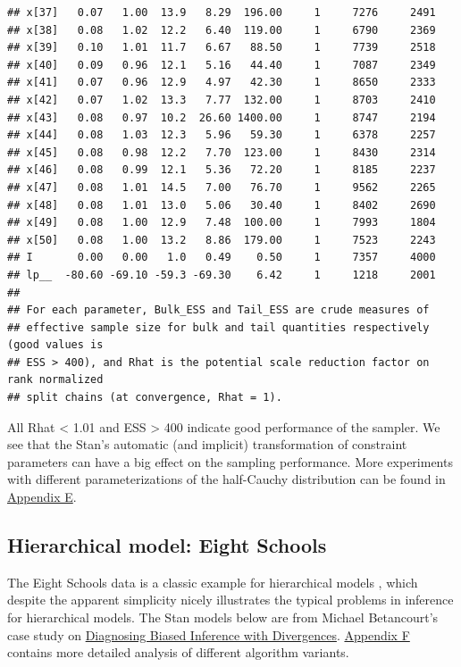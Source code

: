 \documentclass[american,]{article}
\begin{document}
\begin{verbatim}
## x[37]   0.07   1.00  13.9   8.29  196.00     1     7276     2491
## x[38]   0.08   1.02  12.2   6.40  119.00     1     6790     2369
## x[39]   0.10   1.01  11.7   6.67   88.50     1     7739     2518
## x[40]   0.09   0.96  12.1   5.16   44.40     1     7087     2349
## x[41]   0.07   0.96  12.9   4.97   42.30     1     8650     2333
## x[42]   0.07   1.02  13.3   7.77  132.00     1     8703     2410
## x[43]   0.08   0.97  10.2  26.60 1400.00     1     8747     2194
## x[44]   0.08   1.03  12.3   5.96   59.30     1     6378     2257
## x[45]   0.08   0.98  12.2   7.70  123.00     1     8430     2314
## x[46]   0.08   0.99  12.1   5.36   72.20     1     8185     2237
## x[47]   0.08   1.01  14.5   7.00   76.70     1     9562     2265
## x[48]   0.08   1.01  13.0   5.06   30.40     1     8402     2690
## x[49]   0.08   1.00  12.9   7.48  100.00     1     7993     1804
## x[50]   0.08   1.00  13.2   8.86  179.00     1     7523     2243
## I       0.00   0.00   1.0   0.49    0.50     1     7357     4000
## lp__  -80.60 -69.10 -59.3 -69.30    6.42     1     1218     2001
## 
## For each parameter, Bulk_ESS and Tail_ESS are crude measures of 
## effective sample size for bulk and tail quantities respectively (good values is 
## ESS > 400), and Rhat is the potential scale reduction factor on rank normalized
## split chains (at convergence, Rhat = 1).
\end{verbatim}

All Rhat \textless{} 1.01 and ESS \textgreater{} 400 indicate good
performance of the sampler. We see that the Stan's automatic (and
implicit) transformation of constraint parameters can have a big effect
on the sampling performance. More experiments with different
parameterizations of the half-Cauchy distribution can be found in
\protect\hyperlink{AppendixE}{Appendix E}.

\hypertarget{eightschools}{%
\subsection{Hierarchical model: Eight Schools}\label{eightschools}}

The Eight Schools data is a classic example for hierarchical models
\citep[see Section 5.5 in][]{BDA3}, which despite the apparent
simplicity nicely illustrates the typical problems in inference for
hierarchical models. The Stan models below are from Michael Betancourt's
case study on
\href{http://mc-stan.org/users/documentation/case-studies/divergences_and_bias.html}{Diagnosing
Biased Inference with Divergences}.
\protect\hyperlink{AppendixF}{Appendix F} contains more detailed
analysis of different algorithm variants.
\end{document}
